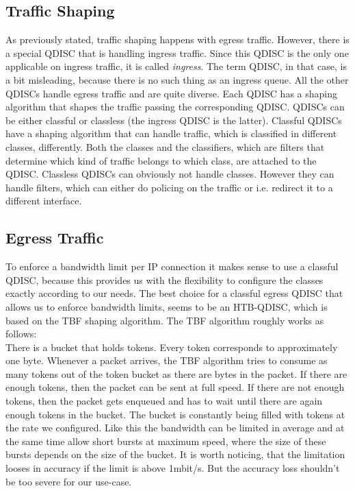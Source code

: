 \subsection{Traffic Shaping}
As previously stated, traffic shaping happens with egress traffic. However, there is a special \acs{QDISC} that is handling ingress traffic. Since this \acs{QDISC} is the only one applicable on ingress traffic, it is called \textit{ingress}. The term \acl{QDISC}, in that case, is a bit misleading, because there is no such thing as an ingress queue. All the other \acsp{QDISC} handle egress traffic and are quite diverse. Each \acs{QDISC} has a shaping algorithm that shapes the traffic passing the corresponding \acs{QDISC}. \acsp{QDISC} can be either classful or classless (the ingress \acs{QDISC} is the latter). Classful \acsp{QDISC} have a shaping algorithm that can handle traffic, which is classified in different classes, differently. Both the classes and the classifiers, which are filters that determine which kind of traffic belongs to which class, are attached to the \acs{QDISC}. Classless \acsp{QDISC} can obviously not handle classes. However they can handle filters, which can either do policing on the traffic or i.e. redirect it to a different interface.

\subsection{Egress Traffic}
To enforce a bandwidth limit per \acs{IP} connection it makes sense to use a classful \acs{QDISC}, because this provides us with the flexibility to configure the classes exactly according to our needs. The best choice for a classful egress \acs{QDISC} that allows us to enforce bandwidth limits, seems to be an \ac{HTB}-\acs{QDISC}, which is based on the \ac{TBF} shaping algorithm. The \acs{TBF} algorithm roughly works as follows: 
\\There is a bucket that holds tokens. Every token corresponds to approximately one byte. Whenever a packet arrives, the \acs{TBF} algorithm tries to consume as many tokens out of the token bucket as there are bytes in the packet. If there are enough tokens, then the packet can be sent at full speed. If there are not enough tokens, then the packet gets enqueued and has to wait until there are again enough tokens in the bucket. The bucket is constantly being filled with tokens at the rate we configured. Like this the bandwidth can be limited in average and at the same time allow short bursts at maximum speed, where the size of these bursts depends on the size of the bucket. It is worth noticing, that the limitation looses in accuracy if the limit is above 1mbit/s. But the accuracy loss shouldn't be too severe for our use-case.

